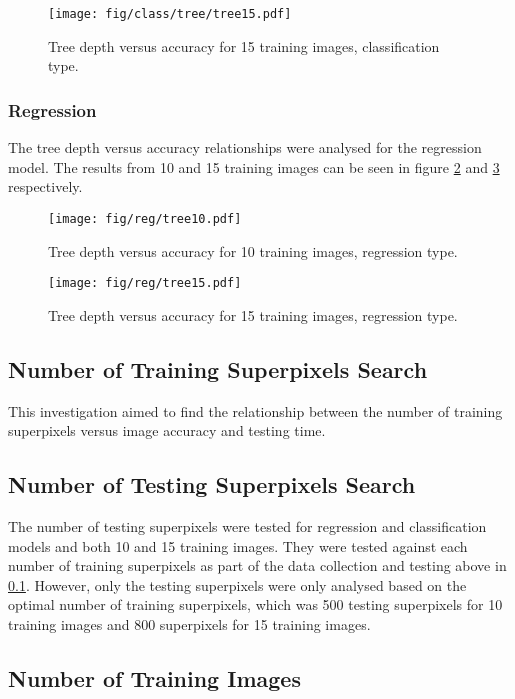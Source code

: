 \begin{table}[H]
\begin{figure}[H]
\centering
\texttt{[image: fig/class/tree/tree15.pdf]}
\caption{Tree depth versus accuracy for 15 training images, classification type.}
\label{class:tree15}
\end{figure}

\subsubsection{Regression}
The tree depth versus accuracy relationships were analysed for the regression model. The results from 10 and 15 training images can be seen in figure \ref{reg:tree10} and \ref{reg:tree15} respectively.

\begin{figure}[H]
\centering
\texttt{[image: fig/reg/tree10.pdf]}
\caption{Tree depth versus accuracy for 10 training images, regression type.}
\label{reg:tree10}
\end{figure}

\begin{figure}[H]
\centering
\texttt{[image: fig/reg/tree15.pdf]}
\caption{Tree depth versus accuracy for 15 training images, regression type.}
\label{reg:tree15}
\end{figure}

\subsection{Number of Training Superpixels Search}
\label{res:trainpix}
This investigation aimed to find the relationship between the number of training superpixels versus image accuracy and testing time.

\subsection{Number of Testing Superpixels Search}
The number of testing superpixels were tested for regression and classification models and both 10 and 15 training images. They were tested against each number of training superpixels as part of the data collection and testing above in \ref{res:trainpix}. However, only the testing superpixels were only analysed based on the optimal number of training superpixels, which was 500 testing superpixels for 10 training images and 800 superpixels for 15 training images.



\subsection{Number of Training Images}


\end{table}
